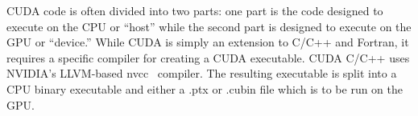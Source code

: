 
CUDA code is often divided into two parts: one part is the code designed to
execute on the CPU or ``host'' while the second part is designed to execute on the
GPU or ``device.''  While CUDA is simply an extension to C/C++ and Fortran, it
requires a specific compiler for creating a CUDA executable. CUDA C/C++ uses
NVIDIA's LLVM-based nvcc~\cite{nvcc} compiler. The resulting executable is split into a
CPU binary executable and either a .ptx or .cubin file which is to be run on the
GPU.



